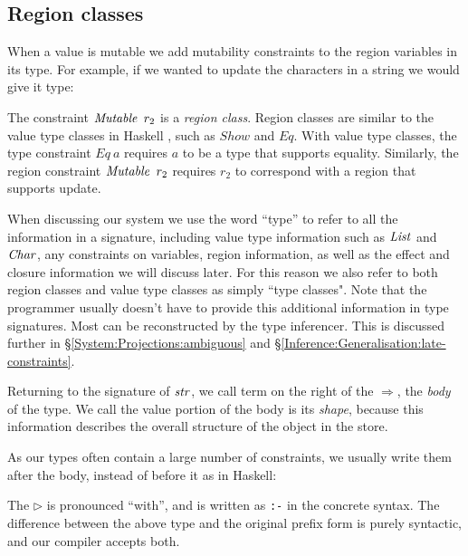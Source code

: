 \code{
	$\iChar$ 	& $:: \% \to *$ \\
	$\iList$ 	& $:: \% \to * \to *$ \\
	$\iPair$ 	& $:: \% \to * \to * \to *$ 
}


\subsection{Region classes}
When a value is mutable we add mutability constraints to the region variables in its type. For example, if we wanted to update the characters in a string we would give it type:


The constraint $\operatorname{\mathit{Mutable}} \ r_2$ is a \emph{region class}. Region classes are similar to the value type classes in Haskell \cite{hall:type-classes}, such as $Show$ and $Eq$. With value type classes, the type constraint $Eq \ a$ requires $a$ to be a type that supports equality. Similarly, the region constraint $\operatorname{\mathit{Mutable}} \ r_2$ requires $r_2$ to correspond with a region that supports update.

When discussing our system we use the word ``type'' to refer to all the information in a signature, including value type information such as $\iList$ and $\iChar$, any constraints on variables, region information, as well as the effect and closure information we will discuss later. For this reason we also refer to both region classes and value type classes as simply ``type classes". Note that the programmer usually doesn't have to provide this additional information in type signatures. Most can be reconstructed by the type inferencer. This is discussed further in \S\ref{System:Projections:ambiguous} and \S\ref{Inference:Generalisation:late-constraints}.

Returning to the signature of $\operatorname{\mathit{str}}$, we call term on the right of the $\Rightarrow$, the \emph{body} of the type. We call the value portion of the body is its \emph{shape}, because this information describes the overall structure of the object in the store.

As our types often contain a large number of constraints, we usually write them after the body, instead of before it as in Haskell:


The $\rhd$ is pronounced ``with'', and is written as \texttt{:-} in the concrete syntax. The difference between the above type and the original prefix form is purely syntactic, and our compiler accepts both.

